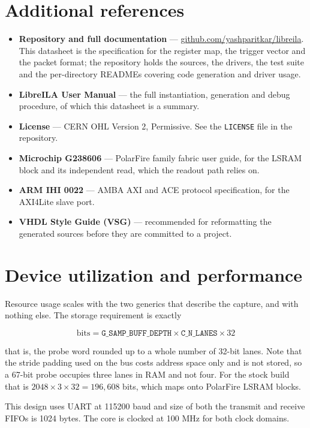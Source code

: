 \documentclass[twocolumn]{article}
\begin{document}
\newpage
\section{Additional references}
\begin{itemize}
    \item \textbf{Repository and full documentation} ---
          \url{github.com/yashparitkar/libreila}. This datasheet is the specification for the register map, the trigger vector and the packet format; the repository holds the sources, the drivers, the test suite and the per-directory READMEs covering code generation and driver usage.
    \item \textbf{LibreILA User Manual} --- the full instantiation, generation and debug procedure, of which this datasheet is a summary.
    \item \textbf{License} --- CERN \acf{OHL} Version 2, Permissive. See the \texttt{LICENSE} file in the repository.
    \item \textbf{Microchip G238606} --- PolarFire family fabric user guide, for the \acs{LSRAM} block and its independent read, which the readout path relies on.
    \item \textbf{ARM IHI 0022} --- AMBA \acs{AXI} and ACE protocol specification, for the AXI4Lite slave port.
    \item \textbf{VHDL Style Guide (VSG)} --- recommended for reformatting the generated sources before they are committed to a project.
\end{itemize}

\newpage
\section{Device utilization and performance}
\label{sec:utilization}
Resource usage scales with the two generics that describe the capture, and with nothing else. The storage requirement is exactly

\[
    \mathrm{bits} = \mathtt{G\_SAMP\_BUFF\_DEPTH} \times
                    \mathtt{C\_N\_LANES} \times 32
\]

that is, the probe word rounded up to a whole number of 32-bit lanes. Note that the stride padding used on the bus costs address space only and is not stored, so a 67-bit probe occupies three lanes in RAM and not four. For the stock build that is $2048 \times 3 \times 32 = 196{,}608$ bits, which maps onto PolarFire \acs{LSRAM} blocks.

This design uses UART at 115200 baud and size of both the transmit and receive \acs{FIFO}s is 1024 bytes. The core is clocked at 100 MHz for both clock domains.
\end{document}
